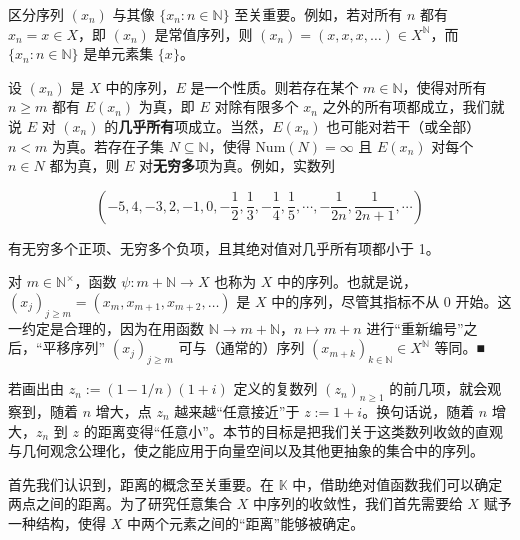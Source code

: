 \begin{remark}

\begin{items}
\item

区分序列  $ (x_n) $ 与其像  $ \{x_n : n \in \mathbb{N}\} $ 至关重要。例如，若对所有  $ n $ 都有  $ x_n = x \in X $，即  $ (x_n) $ 是常值序列，则  $ (x_n) = (x, x, x, \ldots) \in X^{\mathbb{N}} $，而  $ \{x_n : n \in \mathbb{N}\} $ 是单元素集  $ \{x\} $。

\item

设  $ (x_n) $ 是  $ X $ 中的序列，$ E $ 是一个性质。则若存在某个  $ m \in \mathbb{N} $，使得对所有  $ n \geq m $ 都有  $ E(x_n) $ 为真，即  $ E $ 对除有限多个  $ x_n $ 之外的所有项都成立，我们就说  $ E $ 对  $ (x_n) $ 的\textbf{几乎所有}项成立。当然，$ E(x_n) $ 也可能对若干（或全部）$ n < m $ 为真。若存在子集  $ N \subseteq \mathbb{N} $，使得  $ \text{Num}(N) = \infty $ 且  $ E(x_n) $ 对每个  $ n \in N $ 都为真，则  $ E $ 对\textbf{无穷多}项为真。例如，实数列

\[
\left(-5,4,-3,2,-1,0,-\frac{1}{2},\frac{1}{3},-\frac{1}{4},\frac{1}{5},\cdots,-\frac{1}{2n},\frac{1}{2n+1},\cdots\right)
\]

有无穷多个正项、无穷多个负项，且其绝对值对几乎所有项都小于 1。

\item

对  $ m \in \mathbb{N}^\times $，函数  $ \psi: m + \mathbb{N} \to X $ 也称为  $ X $ 中的序列。也就是说，$ (x_j)_{j \geq m} = (x_m, x_{m+1}, x_{m+2}, \ldots) $ 是  $ X $ 中的序列，尽管其指标不从 0 开始。这一约定是合理的，因为在用函数  $ \mathbb{N} \to m + \mathbb{N} $，$ n \mapsto m + n $ 进行“重新编号”之后，“平移序列” $ (x_j)_{j \geq m} $ 可与（通常的）序列  $ (x_{m+k})_{k \in \mathbb{N}} \in X^{\mathbb{N}} $ 等同。■

\end{items}

若画出由  $ z_n := (1 - 1/n)(1 + i) $ 定义的复数列  $ (z_n)_{n \geq 1} $ 的前几项，就会观察到，随着  $ n $ 增大，点  $ z_n $ 越来越“任意接近”于  $ z := 1 + i $。换句话说，随着  $ n $ 增大，$ z_n $ 到  $ z $ 的距离变得“任意小”。本节的目标是把我们关于这类数列收敛的直观与几何观念公理化，使之能应用于向量空间以及其他更抽象的集合中的序列。

首先我们认识到，距离的概念至关重要。在  $ \mathbb{K} $ 中，借助绝对值函数我们可以确定两点之间的距离。为了研究任意集合  $ X $ 中序列的收敛性，我们首先需要给  $ X $ 赋予一种结构，使得  $ X $ 中两个元素之间的“距离”能够被确定。

\end{remark}

